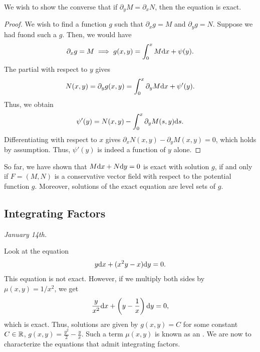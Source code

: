 We wish to show the converse that if $\partial_{y} M = \partial_{x} N$, then the equation is exact.

\begin{proof}
    We wish to find a function $g$ such that $\partial_{x} g = M$ and $\partial_{y} g = N$. Suppose we had fuond such a $g$. Then, we would have
    \begin{align}
        \partial_{x} g = M \implies g(x,y) = \int_{0}^{x} M \mathrm{d}x + \psi(y).
    \end{align}
    The partial with respect to $y$ gives
    \begin{align}
        N(x,y) = \partial_{y} g(x,y) = \int_{0}^{x} \partial_{y} M \mathrm{d}x + \psi'(y).
    \end{align}
    Thus, we obtain
    \begin{align}
        \psi'(y) = N(x,y) - \int_{0}^{x} \partial_{y} M(s,y) \mathrm{d}s.
    \end{align}
    Differentiating with respect to $x$ gives $\partial_{x} N(x,y) - \partial_{y} M(x,y) = 0$, which holds by assumption. Thus, $\psi'(y)$ is indeed a function of $y$ alone.
\end{proof}

So far, we have shown that $M \mathrm{d}x + N \mathrm{d}y = 0$ is exact with solution $g$, if and only if $F = (M,N)$ is a conservative vector field with respect to the potential function $g$. Moreover, solutions of the exact equation are level sets of $g$.

\subsection{Integrating Factors}
\textit{January 14th.}

Look at the equation
\begin{align}
    y \mathrm{d}x + (x^{2}y - x) \mathrm{d}y = 0.
\end{align}
This equation is not exact. However, if we multiply both sides by $\mu(x,y) = 1/x^{2}$, we get
\begin{align}
    \frac{y}{x^{2}} \mathrm{d}x + \left(y - \frac{1}{x}\right) \mathrm{d}y = 0,
\end{align}
which is exact. Thus, solutions are given by $g(x,y) = C$ for some constant $C \in \mathbb{R}$, $g(x,y) = \frac{y^{2}}{2} - \frac{y}{x}$. Such a term $\mu(x,y)$ is known as an . We are now to characterize the equations that admit integrating factors.

